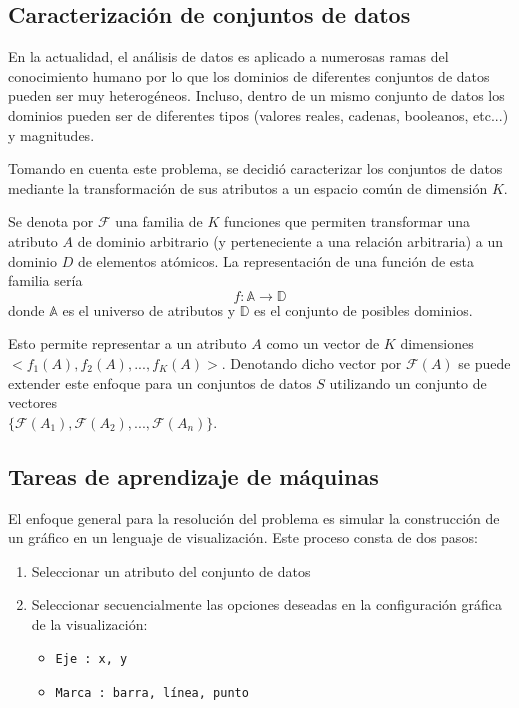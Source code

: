 \subsection{Caracterizaci\'on de conjuntos de datos}



En la actualidad, el an\'alisis de datos es aplicado a numerosas
ramas del conocimiento humano por lo
que los dominios de diferentes conjuntos de datos pueden ser muy heterog\'eneos.
Incluso, dentro de un mismo conjunto de datos los dominios pueden ser de
diferentes tipos (valores reales, cadenas, booleanos, etc...) y magnitudes.

Tomando en cuenta este problema, se decidi\'o caracterizar los conjuntos de datos
mediante la transformaci\'on de sus atributos a un espacio com\'un de dimensi\'on $K$.

\begin{definition}
    Se denota por $\mathcal{F}$ una familia de $K$ funciones que permiten transformar
    una atributo $A$ de dominio arbitrario (y perteneciente a una relaci\'on
    arbitraria) a un dominio $D$ de elementos at\'omicos.
    La representaci\'on de una funci\'on de esta familia ser\'ia
    $$
        f : \mathbb{A} \to \mathbb{D}
    $$
    donde $\mathbb{A}$ es el universo de atributos y $\mathbb{D}$ es el conjunto de posibles dominios.
\end{definition}

Esto permite representar a un atributo $A$ como un vector de $K$ dimensiones \\$ <f_1(A), f_2(A), ..., f_K(A)>$. Denotando dicho vector
por $\mathcal{F}(A)$ se puede extender este enfoque para un conjuntos de datos $S$ utilizando un conjunto de vectores \\
$\{ \mathcal{F}(A_1), \mathcal{F}(A_2), ..., \mathcal{F}(A_n)\}$.


\subsection{Tareas de aprendizaje de m\'aquinas}

El enfoque general para la resoluci\'on del problema es simular la
construcci\'on de un gr\'afico en un lenguaje de visualizaci\'on. Este proceso
consta de dos pasos:

\begin{enumerate}
    \item Seleccionar un atributo del conjunto de datos
    \item Seleccionar secuencialmente las opciones deseadas en la configuraci\'on gr\'afica de la visualizaci\'on: \begin{itemize}
        \item \tt Eje : x, y
        \item \tt Marca : barra, l\'inea, punto
    \end{itemize}
\end{enumerate}

